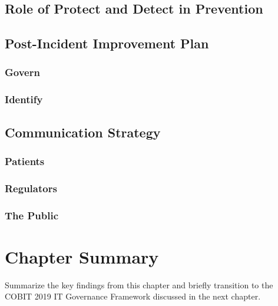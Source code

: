 

\subsection{Role of Protect and Detect in Prevention}



\subsection{Post-Incident Improvement Plan}


\subsubsection{Govern}

\subsubsection{Identify}


\subsection{Communication Strategy}

\subsubsection{Patients}

\subsubsection{Regulators}

\subsubsection{The Public}


\section*{Chapter Summary}

Summarize the key findings from this chapter and briefly transition to the COBIT 2019 IT Governance Framework discussed in the next chapter.
